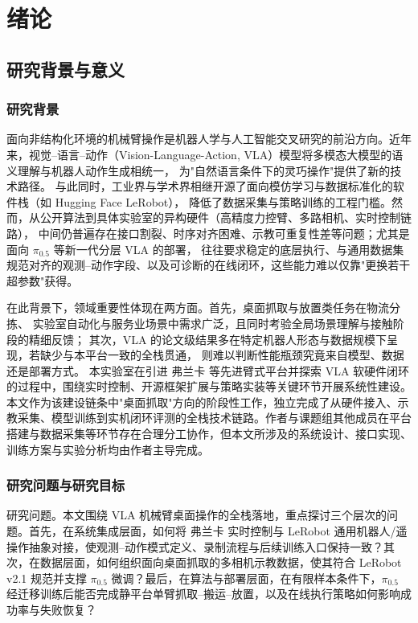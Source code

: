 
\chapter{绪论}
\label{chap:introduction}

\section{研究背景与意义}

\subsection{研究背景}

面向非结构化环境的机械臂操作是机器人学与人工智能交叉研究的前沿方向。近年来，视觉--语言--动作（Vision-Language-Action, VLA）模型将多模态大模型的语义理解与机器人动作生成相统一，
为"自然语言条件下的灵巧操作"提供了新的技术路径\cite{black2024pi0,black2025pi05}。
与此同时，工业界与学术界相继开源了面向模仿学习与数据标准化的软件栈（如 Hugging Face LeRobot），
降低了数据采集与策略训练的工程门槛。然而，从公开算法到具体实验室的异构硬件（高精度力控臂、多路相机、实时控制链路），
中间仍普遍存在接口割裂、时序对齐困难、示教可重复性差等问题；尤其是面向 $\pi_{0.5}$ 等新一代分层 VLA 的部署，
往往要求稳定的底层执行、与通用数据集规范对齐的观测--动作字段、以及可诊断的在线闭环，这些能力难以仅靠"更换若干超参数"获得。

在此背景下，领域重要性体现在两方面。首先，桌面抓取与放置类任务在物流分拣、
实验室自动化与服务业场景中需求广泛，且同时考验全局场景理解与接触阶段的精细反馈；
其次，VLA 的论文级结果多在特定机器人形态与数据规模下呈现，若缺少与本平台一致的全栈贯通，
则难以判断性能瓶颈究竟来自模型、数据还是部署方式。
本实验室在引进 弗兰卡 等先进臂式平台并探索 VLA 软硬件闭环的过程中，围绕实时控制、开源框架扩展与策略实装等关键环节开展系统性建设。本文作为该建设链条中"桌面抓取"方向的阶段性工作，独立完成了从硬件接入、示教采集、模型训练到实机闭环评测的全栈技术链路。作者与课题组其他成员在平台搭建与数据采集等环节存在合理分工协作，但本文所涉及的系统设计、接口实现、训练方案与实验分析均由作者主导完成。

\subsection{研究问题与研究目标}

研究问题。本文围绕 VLA 机械臂桌面操作的全栈落地，重点探讨三个层次的问题。首先，在系统集成层面，如何将 弗兰卡 实时控制与 LeRobot 通用机器人/遥操作抽象对接，使观测--动作模式定义、录制流程与后续训练入口保持一致？其次，在数据层面，如何组织面向桌面抓取的多相机示教数据，使其符合 LeRobot v2.1 规范并支撑 $\pi_{0.5}$ 微调？最后，在算法与部署层面，在有限样本条件下，$\pi_{0.5}$ 经迁移训练后能否完成静平台单臂抓取--搬运--放置，以及在线执行策略如何影响成功率与失败恢复？

